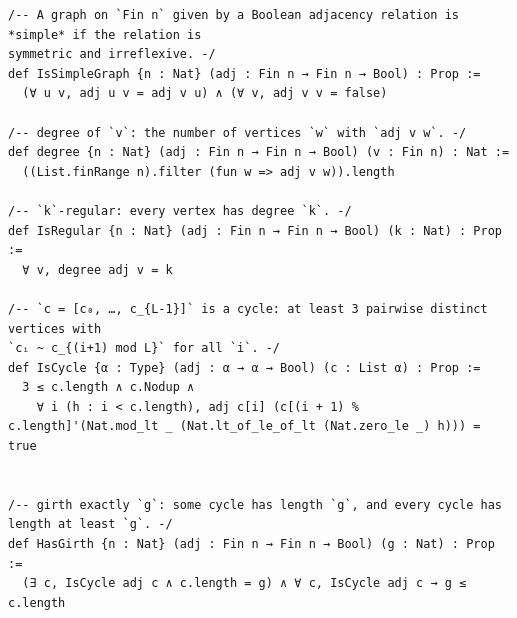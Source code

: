 \begin{Verbatim}[fontsize=\footnotesize,frame=single]
/-- A graph on `Fin n` given by a Boolean adjacency relation is *simple* if the relation is
symmetric and irreflexive. -/
def IsSimpleGraph {n : Nat} (adj : Fin n → Fin n → Bool) : Prop :=
  (∀ u v, adj u v = adj v u) ∧ (∀ v, adj v v = false)

/-- degree of `v`: the number of vertices `w` with `adj v w`. -/
def degree {n : Nat} (adj : Fin n → Fin n → Bool) (v : Fin n) : Nat :=
  ((List.finRange n).filter (fun w => adj v w)).length

/-- `k`-regular: every vertex has degree `k`. -/
def IsRegular {n : Nat} (adj : Fin n → Fin n → Bool) (k : Nat) : Prop :=
  ∀ v, degree adj v = k

/-- `c = [c₀, …, c_{L-1}]` is a cycle: at least 3 pairwise distinct vertices with
`cᵢ ~ c_{(i+1) mod L}` for all `i`. -/
def IsCycle {α : Type} (adj : α → α → Bool) (c : List α) : Prop :=
  3 ≤ c.length ∧ c.Nodup ∧
    ∀ i (h : i < c.length), adj c[i] (c[(i + 1) % c.length]'(Nat.mod_lt _ (Nat.lt_of_le_of_lt (Nat.zero_le _) h))) = true


/-- girth exactly `g`: some cycle has length `g`, and every cycle has length at least `g`. -/
def HasGirth {n : Nat} (adj : Fin n → Fin n → Bool) (g : Nat) : Prop :=
  (∃ c, IsCycle adj c ∧ c.length = g) ∧ ∀ c, IsCycle adj c → g ≤ c.length
\end{Verbatim}
